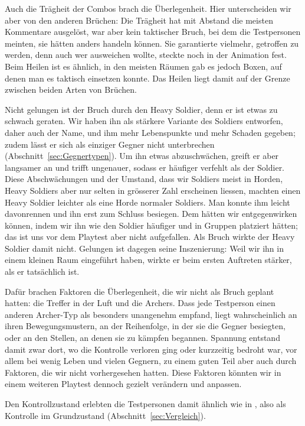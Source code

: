 \documentclass[../Main.tex]{subfiles}
\begin{document}
Auch die Trägheit der Combos brach die Überlegenheit. Hier unterscheiden wir aber von den anderen Brüchen: Die Trägheit hat mit Abstand die meisten Kommentare ausgelöst, war aber kein taktischer Bruch, bei dem die Testpersonen meinten, sie hätten anders handeln können. Sie garantierte vielmehr, getroffen zu werden, denn auch wer ausweichen wollte, steckte noch in der Animation fest. Beim Heilen ist es ähnlich, in den meisten Räumen gab es jedoch Boxen, auf denen man es taktisch einsetzen konnte. Das Heilen liegt damit auf der Grenze zwischen beiden Arten von Brüchen.

Nicht gelungen ist der Bruch durch den Heavy Soldier, denn er ist etwas zu schwach geraten. Wir haben ihn als stärkere Variante des Soldiers entworfen, daher auch der Name, und ihm mehr Lebenspunkte und mehr Schaden gegeben; zudem lässt er sich als einziger Gegner nicht unterbrechen (Abschnitt~\ref{sec:Gegnertypen}). Um ihn etwas abzuschwächen, greift er aber langsamer an und trifft ungenauer, sodass er häufiger verfehlt als der Soldier. Diese Abschwächungen und der Umstand, dass wir Soldiers meist in Horden, Heavy Soldiers aber nur selten in grösserer Zahl erscheinen liessen, machten einen Heavy Soldier leichter als eine Horde normaler Soldiers. Man konnte ihm leicht davonrennen und ihn erst zum Schluss besiegen. Dem hätten wir entgegenwirken können, indem wir ihn wie den Soldier häufiger und in Gruppen platziert hätten; das ist uns vor dem Playtest aber nicht aufgefallen. Als Bruch wirkte der Heavy Soldier damit nicht. Gelungen ist dagegen seine Inszenierung: Weil wir ihn in einem kleinen Raum eingeführt haben, wirkte er beim ersten Auftreten stärker, als er tatsächlich ist.

Dafür brachen Faktoren die Überlegenheit, die wir nicht als Bruch geplant hatten: die Treffer in der Luft und die Archers. Dass jede Testperson einen anderen Archer-Typ als besonders unangenehm empfand, liegt wahrscheinlich an ihren Bewegungsmustern, an der Reihenfolge, in der sie die Gegner besiegten, oder an den Stellen, an denen sie zu kämpfen begannen. Spannung entstand damit zwar dort, wo die Kontrolle verloren ging oder kurzzeitig bedroht war, vor allem bei wenig Leben und vielen Gegnern, zu einem guten Teil aber auch durch Faktoren, die wir nicht vorhergesehen hatten. Diese Faktoren könnten wir in einem weiteren Playtest dennoch gezielt verändern und anpassen.

Den Kontrollzustand erlebten die Testpersonen damit ähnlich wie in , also als Kontrolle im Grundzustand (Abschnitt~\ref{sec:Vergleich}).
\end{document}
